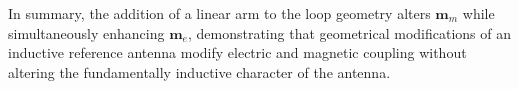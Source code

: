 


In summary, the addition of a linear arm to the loop geometry alters
$\mathbf{m}_m$ while simultaneously enhancing $\mathbf{m}_e$, demonstrating 
that geometrical modifications of an inductive reference antenna modify electric and magnetic coupling without altering the fundamentally inductive character of the antenna.

\FloatBarrier